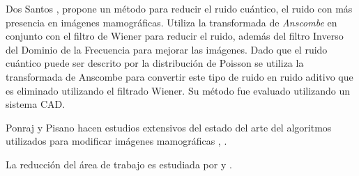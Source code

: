 Dos Santos \cite{romualdopre}, \cite{dos2009mammography} propone un método para
reducir el ruido cuántico, el ruido con más presencia en imágenes mamográficas.
Utiliza la transformada de \textit{Anscombe} en conjunto con el filtro de
Wiener para reducir el ruido, además del filtro Inverso del Dominio de la
Frecuencia para mejorar las imágenes. Dado que el ruido cuántico puede ser
descrito por la distribución de Poisson se utiliza la transformada de Anscombe
para convertir este tipo de ruido en ruido aditivo que es eliminado utilizando
el filtrado Wiener. Su método fue evaluado utilizando un sistema CAD.


Ponraj y Pisano hacen estudios extensivos del estado del arte del algoritmos
utilizados para modificar imágenes mamográficas \cite{ponraj2011survey},
\cite{pisano2000image}.

La reducción del área de trabajo es estudiada por \cite{holguinpre} y
\cite{dehghani2011method}.

